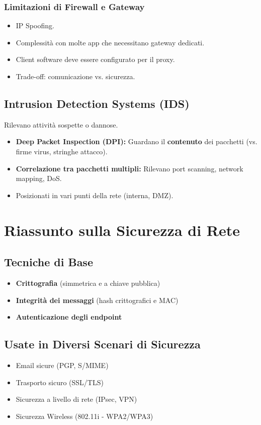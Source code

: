 \documentclass{article}
\begin{document}
\begin{enumerate}
\subsubsection{Limitazioni di Firewall e Gateway}
\begin{itemize}
    \item IP Spoofing.
    \item Complessità con molte app che necessitano gateway dedicati.
    \item Client software deve essere configurato per il proxy.
    \item Trade-off: comunicazione vs. sicurezza.
\end{itemize}

\subsection{Intrusion Detection Systems (IDS)}
Rilevano attività sospette o dannose.
\begin{itemize}
    \item \textbf{Deep Packet Inspection (DPI):} Guardano il \textbf{contenuto} dei pacchetti (vs. firme virus, stringhe attacco).
    \item \textbf{Correlazione tra pacchetti multipli:} Rilevano port scanning, network mapping, DoS.
    \item Posizionati in vari punti della rete (interna, DMZ).
\end{itemize}

\section{Riassunto sulla Sicurezza di Rete}
\label{sec:riassunto_sicurezza}

\subsection{Tecniche di Base}
\begin{itemize}
    \item \textbf{Crittografia} (simmetrica e a chiave pubblica)
    \item \textbf{Integrità dei messaggi} (hash crittografici e MAC)
    \item \textbf{Autenticazione degli endpoint}
\end{itemize}

\subsection{Usate in Diversi Scenari di Sicurezza}
\begin{itemize}
    \item Email sicure (PGP, S/MIME)
    \item Trasporto sicuro (SSL/TLS)
    \item Sicurezza a livello di rete (IPsec, VPN)
    \item Sicurezza Wireless (802.11i - WPA2/WPA3)
\end{itemize}


\end{enumerate}
\end{document}
